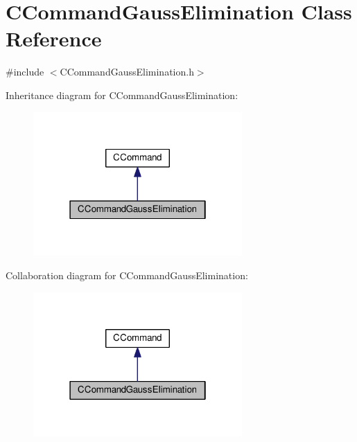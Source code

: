 \hypertarget{classCCommandGaussElimination}{}\section{C\+Command\+Gauss\+Elimination Class Reference}
\label{classCCommandGaussElimination}


{\ttfamily \#include $<$C\+Command\+Gauss\+Elimination.\+h$>$}



Inheritance diagram for C\+Command\+Gauss\+Elimination\+:\nopagebreak
\begin{figure}[H]
\begin{center}
\leavevmode
\includegraphics[width=226pt]{classCCommandGaussElimination__inherit__graph}
\end{center}
\end{figure}


Collaboration diagram for C\+Command\+Gauss\+Elimination\+:\nopagebreak
\begin{figure}[H]
\begin{center}
\leavevmode
\includegraphics[width=226pt]{classCCommandGaussElimination__coll__graph}
\end{center}
\end{figure}
